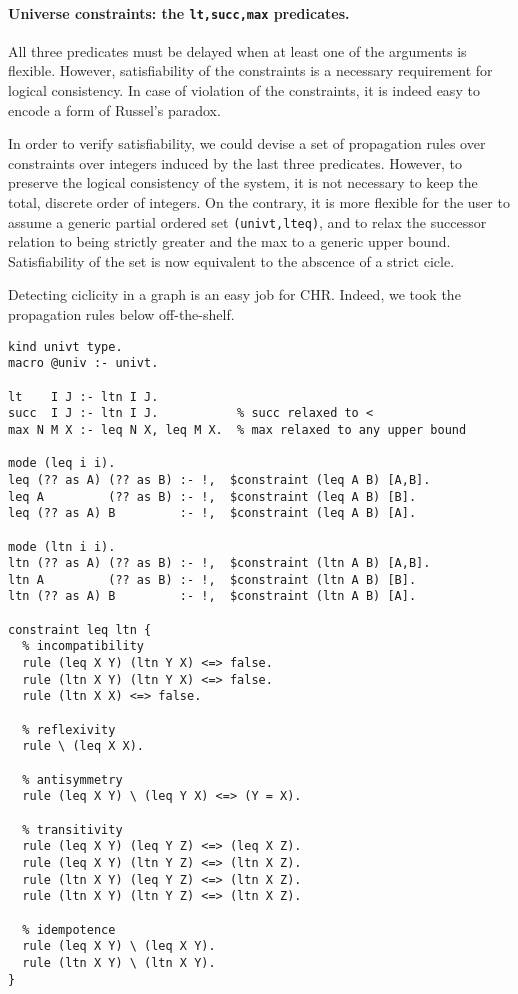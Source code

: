 \documentclass{easychair}
\begin{document}
\paragraph{Universe constraints: the \texttt{lt,succ,max} predicates.}
All three predicates must be delayed when at least one of the arguments is flexible. However, satisfiability of the constraints is a necessary requirement for logical consistency. In case of violation of the constraints, it is indeed easy to encode a form of Russel's paradox.

In order to verify satisfiability, we could devise a set of propagation rules
over constraints over integers induced by the last three predicates. However, to preserve the logical consistency of the system, it is not necessary to keep the total, discrete order of integers. On the contrary, it is more flexible for the user to assume a generic partial ordered set \verb+(univt,lteq)+, and to relax the successor relation to being strictly greater and the max to a generic upper bound. Satisfiability of the set is now equivalent to the abscence of a strict cicle.

Detecting ciclicity in a graph is an easy job for CHR. Indeed, we took the propagation rules below off-the-shelf.

\begin{Verbatim}
kind univt type.
macro @univ :- univt.

lt    I J :- ltn I J.
succ  I J :- ltn I J.           % succ relaxed to <
max N M X :- leq N X, leq M X.  % max relaxed to any upper bound

mode (leq i i).
leq (?? as A) (?? as B) :- !,  $constraint (leq A B) [A,B].
leq A         (?? as B) :- !,  $constraint (leq A B) [B].
leq (?? as A) B         :- !,  $constraint (leq A B) [A].

mode (ltn i i).
ltn (?? as A) (?? as B) :- !,  $constraint (ltn A B) [A,B].
ltn A         (?? as B) :- !,  $constraint (ltn A B) [B].
ltn (?? as A) B         :- !,  $constraint (ltn A B) [A].

constraint leq ltn {
  % incompatibility
  rule (leq X Y) (ltn Y X) <=> false.
  rule (ltn X Y) (ltn Y X) <=> false.
  rule (ltn X X) <=> false.
  
  % reflexivity
  rule \ (leq X X).

  % antisymmetry
  rule (leq X Y) \ (leq Y X) <=> (Y = X).

  % transitivity
  rule (leq X Y) (leq Y Z) <=> (leq X Z).
  rule (leq X Y) (ltn Y Z) <=> (ltn X Z).
  rule (ltn X Y) (leq Y Z) <=> (ltn X Z).
  rule (ltn X Y) (ltn Y Z) <=> (ltn X Z).

  % idempotence
  rule (leq X Y) \ (leq X Y).
  rule (ltn X Y) \ (ltn X Y).
}
\end{Verbatim}
\end{document}
